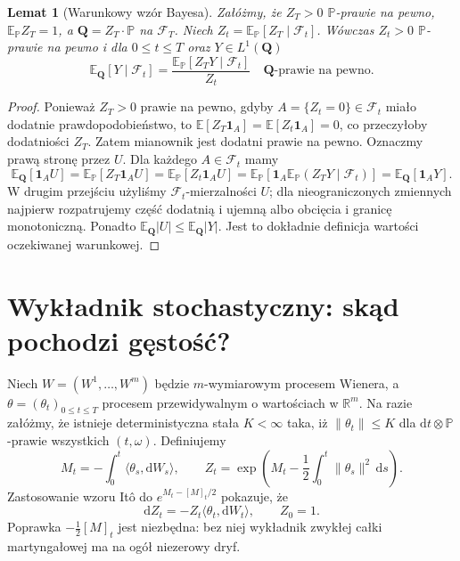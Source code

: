 \documentclass[11pt,a4paper,oneside]{report}
\numberwithin{equation}{chapter}
\theoremstyle{plain}
\newtheorem{lemat}[twierdzenie]{Lemat}
\theoremstyle{definition}
\theoremstyle{remark}
\newcommand{\R}{\mathbb{R}}
\newcommand{\Prob}{\mathbb{P}}
\newcommand{\E}{\mathbb{E}}
\newcommand{\calF}{\mathcal{F}}
\newcommand{\ind}[1]{\mathbf{1}_{#1}}
\newcommand{\dd}{\mathrm{d}}
\newcommand{\norm}[1]{\lVert #1\rVert}
\begin{document}
\begin{lemat}[Warunkowy wzór Bayesa]\label{lem:volIII:08:01}
\label{lem:bayes-change}
Załóżmy, że $Z_T>0$ $\Prob$-prawie na pewno,
$\E_{\Prob}Z_T=1$, a $\mathbf Q=Z_T\cdot\Prob$
na $\calF_T$. Niech $Z_t=\E_{\Prob}[Z_T\mid\calF_t]$.
Wówczas $Z_t>0$ $\Prob$-prawie na pewno i dla
$0\le t\le T$ oraz $Y\in L^1(\mathbf Q)$
\[
\E_{\mathbf Q}[Y\mid\calF_t]
=\frac{\E_{\Prob}[Z_TY\mid\calF_t]}{Z_t}
\quad\mathbf Q\text{-prawie na pewno}.
\tag{8.1}\label{eq:bayes-measure}
\]
\end{lemat}
\begin{proof}
Ponieważ $Z_T>0$ prawie na pewno, gdyby
$A=\{Z_t=0\}\in\calF_t$ miało dodatnie prawdopodobieństwo,
to $\E[Z_T\ind A]=\E[Z_t\ind A]=0$,
co przeczyłoby dodatniości $Z_T$. Zatem mianownik
jest dodatni prawie na pewno. Oznaczmy prawą stronę
przez $U$. Dla każdego $A\in\calF_t$ mamy
\[
\E_{\mathbf Q}[\ind A U]
=\E_{\Prob}[Z_T\ind A U]
=\E_{\Prob}[Z_t\ind A U]
=\E_{\Prob}[\ind A\E_{\Prob}(Z_TY\mid\calF_t)]
=\E_{\mathbf Q}[\ind A Y].
\]
W drugim przejściu użyliśmy $\calF_t$-mierzalności $U$;
dla nieograniczonych zmiennych najpierw rozpatrujemy
część dodatnią i ujemną albo obcięcia i granicę monotoniczną.
Ponadto $\E_{\mathbf Q}|U|\le\E_{\mathbf Q}|Y|$.
Jest to dokładnie definicja wartości oczekiwanej warunkowej.
\end{proof}

\section{Wykładnik stochastyczny: skąd pochodzi gęstość?}\label{sec:volIII:08:02}

Niech $W=(W^1,\ldots,W^m)$ będzie $m$-wymiarowym
procesem Wienera, a $\theta=(\theta_t)_{0\le t\le T}$
procesem przewidywalnym o wartościach w $\R^m$.
Na razie załóżmy, że istnieje deterministyczna stała
$K<\infty$ taka, iż $\norm{\theta_t}\le K$
dla $\dd t\otimes\Prob$-prawie wszystkich $(t,\omega)$.
Definiujemy
\[
M_t=-\int_0^t\langle\theta_s,\dd W_s\rangle,
\qquad
Z_t=\exp\left(M_t-\frac12\int_0^t\norm{\theta_s}^2\,\dd s\right).
\tag{8.2}\label{eq:girsanov-density}
\]
Zastosowanie wzoru Itô do $e^{M_t-[M]_t/2}$
pokazuje, że
\[
\dd Z_t=-Z_t\langle\theta_t,\dd W_t\rangle,
\qquad Z_0=1.
\tag{8.3}\label{eq:density-sde}
\]
Poprawka $-\frac12[M]_t$ jest niezbędna: bez niej
wykładnik zwykłej całki martyngałowej ma na ogół
niezerowy dryf.
\end{document}
